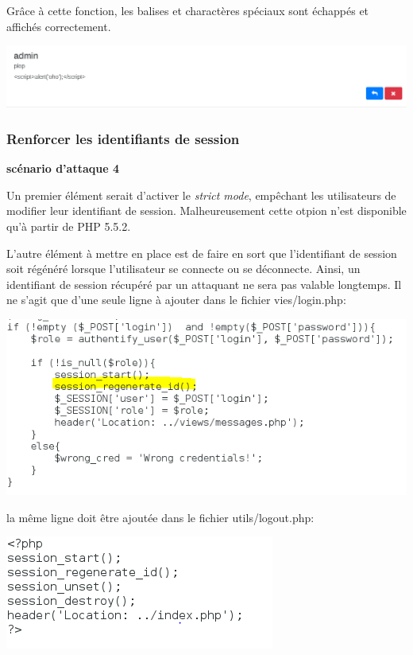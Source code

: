 \documentclass{article}
\begin{document}
Grâce à cette fonction, les balises et charactères spéciaux sont
échappés et affichés correctement.

\includegraphics{images/xss_impl1.png}

\hypertarget{renforcer-les-identifiants-de-session}{%
\subsubsection{Renforcer les identifiants de
session}\label{renforcer-les-identifiants-de-session}}

\textbf{scénario d'attaque 4}

Un premier élément serait d'activer le \emph{strict mode}, empêchant les
utilisateurs de modifier leur identifiant de session. Malheureusement
cette otpion n'est disponible qu'à partir de PHP 5.5.2.

L'autre élément à mettre en place est de faire en sort que l'identifiant
de session soit régénéré lorsque l'utilisateur se connecte ou se
déconnecte. Ainsi, un identifiant de session récupéré par un attaquant
ne sera pas valable longtemps. Il ne s'agit que d'une seule ligne à
ajouter dans le fichier vies/login.php:

\includegraphics{images/session_code.PNG}

la même ligne doit être ajoutée dans le fichier utils/logout.php:

\includegraphics{images/session_logout.PNG}
\end{document}
